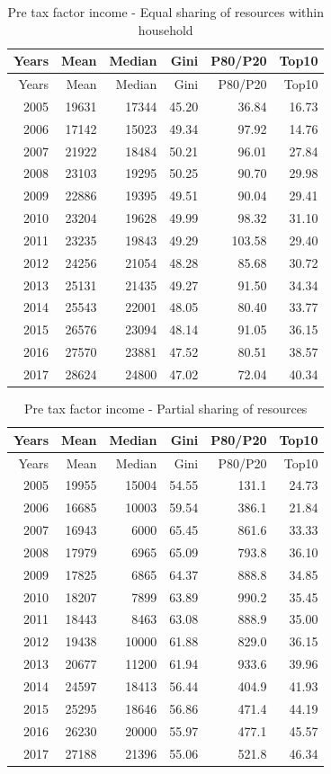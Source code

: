 \documentclass[12pt,]{article}
\begin{document}
\begin{longtable}[]{@{}rrrrrr@{}}
\caption{Pre tax factor income - Equal sharing of resources within
household}\tabularnewline
\toprule
Years & Mean & Median & Gini & P80/P20 & Top10\tabularnewline
\midrule
\endfirsthead
\toprule
Years & Mean & Median & Gini & P80/P20 & Top10\tabularnewline
\midrule
\endhead
2005 & 19631 & 17344 & 45.20 & 36.84 & 16.73\tabularnewline
2006 & 17142 & 15023 & 49.34 & 97.92 & 14.76\tabularnewline
2007 & 21922 & 18484 & 50.21 & 96.01 & 27.84\tabularnewline
2008 & 23103 & 19295 & 50.25 & 90.70 & 29.98\tabularnewline
2009 & 22886 & 19395 & 49.51 & 90.04 & 29.41\tabularnewline
2010 & 23204 & 19628 & 49.99 & 98.32 & 31.10\tabularnewline
2011 & 23235 & 19843 & 49.29 & 103.58 & 29.40\tabularnewline
2012 & 24256 & 21054 & 48.28 & 85.68 & 30.72\tabularnewline
2013 & 25131 & 21435 & 49.27 & 91.50 & 34.34\tabularnewline
2014 & 25543 & 22001 & 48.05 & 80.40 & 33.77\tabularnewline
2015 & 26576 & 23094 & 48.14 & 91.05 & 36.15\tabularnewline
2016 & 27570 & 23881 & 47.52 & 80.51 & 38.57\tabularnewline
2017 & 28624 & 24800 & 47.02 & 72.04 & 40.34\tabularnewline
\bottomrule
\end{longtable}

\begin{longtable}[]{@{}rrrrrr@{}}
\caption{Pre tax factor income - Partial sharing of
resources}\tabularnewline
\toprule
Years & Mean & Median & Gini & P80/P20 & Top10\tabularnewline
\midrule
\endfirsthead
\toprule
Years & Mean & Median & Gini & P80/P20 & Top10\tabularnewline
\midrule
\endhead
2005 & 19955 & 15004 & 54.55 & 131.1 & 24.73\tabularnewline
2006 & 16685 & 10003 & 59.54 & 386.1 & 21.84\tabularnewline
2007 & 16943 & 6000 & 65.45 & 861.6 & 33.33\tabularnewline
2008 & 17979 & 6965 & 65.09 & 793.8 & 36.10\tabularnewline
2009 & 17825 & 6865 & 64.37 & 888.8 & 34.85\tabularnewline
2010 & 18207 & 7899 & 63.89 & 990.2 & 35.45\tabularnewline
2011 & 18443 & 8463 & 63.08 & 888.9 & 35.00\tabularnewline
2012 & 19438 & 10000 & 61.88 & 829.0 & 36.15\tabularnewline
2013 & 20677 & 11200 & 61.94 & 933.6 & 39.96\tabularnewline
2014 & 24597 & 18413 & 56.44 & 404.9 & 41.93\tabularnewline
2015 & 25295 & 18646 & 56.86 & 471.4 & 44.19\tabularnewline
2016 & 26230 & 20000 & 55.97 & 477.1 & 45.57\tabularnewline
2017 & 27188 & 21396 & 55.06 & 521.8 & 46.34\tabularnewline
\bottomrule
\end{longtable}
\end{document}
